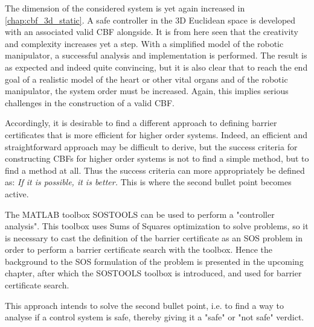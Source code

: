 The dimension of the considered system is yet again increased in \autoref{chap:cbf_3d_static}. A safe controller in the 3D Euclidean space is developed with an associated valid CBF alongside. It is from here seen that the creativity and complexity increases yet a step. With a simplified model of the robotic manipulator, a successful analysis and implementation is performed. The result is as expected and indeed quite convincing, but it is also clear that to reach the end goal of a realistic model of the heart or other vital organs and of the robotic manipulator, the system order must be increased. Again, this implies serious challenges in the construction of a valid CBF.


Accordingly, it is desirable to find a different approach to defining barrier certificates that is more efficient for higher order systems. Indeed, an efficient and straightforward approach may be difficult to derive, but the success criteria for constructing CBFs for higher order systems is not to find a simple method, but to find a method at all. Thus the success criteria can more appropriately be defined as: \textit{If it is possible, it is better.} This is where the second bullet point becomes active.

The MATLAB toolbox SOSTOOLS can be used to perform a "controller analysis". This toolbox uses Sums of Squares optimization to solve problems, so it is necessary to cast the definition of the barrier certificate as an SOS problem in order to perform a barrier certificate search with the toolbox. Hence the background to the SOS  formulation of the problem is presented in the upcoming chapter, after which the SOSTOOLS toolbox is introduced, and used for barrier certificate search.

This approach intends to solve the second bullet point, i.e. to find a way to analyse if a control system is safe, thereby giving it a "safe" or "not safe" verdict.